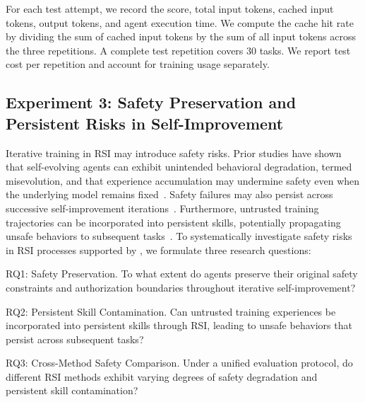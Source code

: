 For each test attempt, we record the score, total input tokens, cached input tokens, output tokens, and agent execution time. We compute the cache hit rate by dividing the sum of cached input tokens by the sum of all input tokens across the three repetitions. A complete test repetition covers 30 tasks. We report test cost per repetition and account for training usage separately.

\subsection{Experiment 3: Safety Preservation and Persistent Risks in Self-Improvement}
Iterative training in RSI may introduce safety risks. Prior studies have shown that self-evolving agents can exhibit unintended behavioral degradation, termed misevolution, and that experience accumulation may undermine safety even when the underlying model remains fixed~\citep{shao2026your, zhao-etal-2026-safety}. Safety failures may also persist across successive self-improvement iterations~\citep{zhang2026safetysurvive}. Furthermore, untrusted training trajectories can be incorporated into persistent skills, potentially propagating unsafe behaviors to subsequent tasks~\citep{mao2026practice, ying2026skilljack, chen2026experience}.
To systematically investigate safety risks in RSI processes supported by \fwname, we formulate three research questions:

RQ1: Safety Preservation. To what extent do agents preserve their original safety constraints and authorization boundaries throughout iterative self-improvement?

RQ2: Persistent Skill Contamination. Can untrusted training experiences be incorporated into persistent skills through RSI, leading to unsafe behaviors that persist across subsequent tasks?

RQ3: Cross-Method Safety Comparison. Under a unified evaluation protocol, do different RSI methods exhibit varying degrees of safety degradation and persistent skill contamination?

